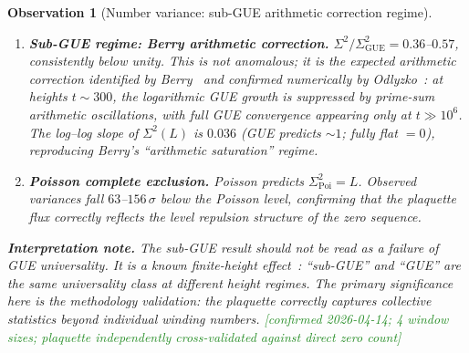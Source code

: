 \documentclass[11pt, a4paper]{article}
\theoremstyle{definition}
\theoremstyle{plain}
\newtheorem{observation}[theorem]{Observation}
\begin{document}
\begin{observation}[Number variance: sub-GUE arithmetic correction regime]
\begin{enumerate}
  \item \textbf{Sub-GUE regime: Berry arithmetic correction.}
        $\Sigma^2/\Sigma^2_{\mathrm{GUE}} = 0.36$--$0.57$, consistently
        below unity.  This is not anomalous; it is the
        expected \emph{arithmetic correction} identified by
        Berry~\cite{berry1988} and confirmed numerically by
        Odlyzko~\cite{odlyzko1987}: at heights $t\sim 300$, the
        logarithmic GUE growth is suppressed by prime-sum arithmetic
        oscillations, with full GUE convergence appearing only at
        $t\gg 10^6$.  The log--log slope of $\Sigma^2(L)$
        is $0.036$ (GUE predicts $\sim\!1$; fully flat $= 0$),
        reproducing Berry's ``arithmetic saturation'' regime.

  \item \textbf{Poisson complete exclusion.}
        Poisson predicts $\Sigma^2_{\mathrm{Poi}}=L$.
        Observed variances fall $63$--$156\,\sigma$ below the Poisson
        level, confirming that the plaquette flux correctly reflects the
        level repulsion structure of the zero sequence.
\end{enumerate}

\noindent
\textbf{Interpretation note.}\;
The sub-GUE result should \emph{not} be read as a failure of GUE
universality.  It is a known finite-height effect~\cite{berry1988}:
``sub-GUE'' and ``GUE'' are the same universality class at different
height regimes.  The primary significance here is the
\emph{methodology validation}: the plaquette correctly captures
collective statistics beyond individual winding numbers.
\textcolor{ForestGreen}{[confirmed 2026-04-14; 4 window sizes;
plaquette independently cross-validated against direct zero count]}
\end{observation}
\end{document}
